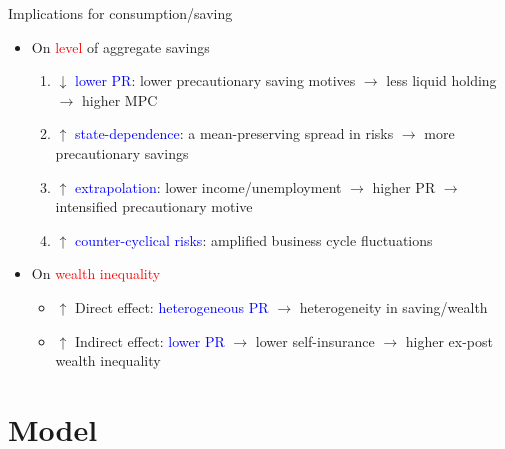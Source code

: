 \documentclass{beamer}
\begin{document}
\begin{frame}{Implications for consumption/saving}
	\begin{itemize}
		\item On \textcolor{red}{level} of aggregate savings
	\begin{enumerate}
		\item $\downarrow$ \textcolor{blue}{lower PR}: lower precautionary saving motives $\rightarrow$ less liquid holding $\rightarrow$ higher MPC
		\pause
		\item $\uparrow$  \textcolor{blue}{state-dependence}: a mean-preserving spread in risks
	 $\rightarrow$  more precautionary savings \cite{caballero1990consumption}
	 	\pause
	\item $\uparrow$ \textcolor{blue}{extrapolation}: lower income/unemployment $\rightarrow$ higher PR $\rightarrow$ intensified precautionary motive 
		\pause
		\item $\uparrow$ \textcolor{blue}{counter-cyclical risks}:  amplified business cycle fluctuations \cite{bayer2019precautionary}
	\end{enumerate}
\pause 
\item On \textcolor{red}{wealth inequality}
\begin{itemize}
	\item 	$\uparrow$ Direct effect: \textcolor{blue}{heterogeneous PR} $\rightarrow$ heterogeneity in saving/wealth
\item $\uparrow$ Indirect effect: \textcolor{blue}{lower PR} $\rightarrow$ lower self-insurance $\rightarrow$ higher  ex-post wealth inequality
	\end{itemize}
	\end{itemize}
\end{frame}


\section{Model}
\end{document}
